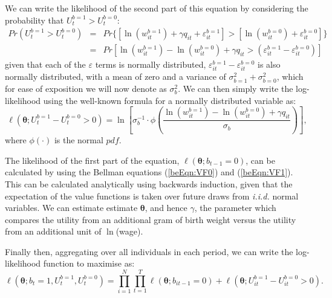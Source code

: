 \documentclass[a4paper, 12 pt]{article}
\theoremstyle{plain}
\begin{document}
\begin{doublespace}
We can write the likelihood of the second part of this equation by considering
the probability that $U_t^{b=1}>U_t^{b=0}$:
\begin{eqnarray}
\label{bqEqn:LL2}
Pr(U_t^{b=1}>U_t^{b=0})&=&Pr\{[\ln(w_{it}^{b=1}) + \gamma q_{it} + \varepsilon^{b=1}_{it}]
>[\ln(w_{it}^{b=0}) + \varepsilon^{b=0}_{it}]\} \nonumber \\
&=&Pr[\ln(w_{it}^{b=1})-\ln(w_{it}^{b=0})+ \gamma q_{it} >
(\varepsilon^{b=1}_{it}-\varepsilon^{b=0}_{it})]
\end{eqnarray}
given that each of the $\varepsilon$ terms is normally distributed,
$\varepsilon^{b=1}_{it}-\varepsilon^{b=0}_{it}$ is also normally distributed,
with a mean of zero and a variance of $\sigma_{b=1}^2+\sigma_{b=0}^2$, which for
ease of exposition we will now denote as $\sigma^2_b$.  We can then simply
write the log-likelihood using the well-known formula for a normally distributed
variable as:
\begin{equation}
\ell(\bm\theta;U_t^{b=1}-U_t^{b=0}>0) = \ln\left[\sigma_b^{-1}\cdot\phi
\left(\frac{\ln(w_{it}^{b=1})-\ln(w_{it}^{b=0})+ \gamma q_{it}}{\sigma_b}\right)\right],
\end{equation}
where $\phi(\cdot)$ is the normal $pdf$.

The likelihood of the first part of the equation, $\ell(\bm\theta;b_{t-1}=0)$, can
be calculated by using the Bellman equations (\ref{beEqn:VF0}) and (\ref{beEqn:VF1}).
This can be calculated analytically using backwards induction, given that the
expectation of the value functions is taken over future draws from \emph{i.i.d.} normal
variables.  We can estimate estimate $\bm{\theta}$, and
hence $\gamma$, the parameter which compares the utility from an additional gram of
birth weight versus the utility from an additional unit of $\ln$(wage).

Finally then, aggregating over all individuals in each period, we can write the
log-likelihood function to maximise as:
\[
\ell(\bm\theta;b_t=1,U_t^{b=1},U_t^{b=0})= \prod_{i=1}^N\prod_{t=1}^T
\ell(\bm\theta;b_{it-1}=0) + \ell(\bm\theta;U_{it}^{b=1}-U_{it}^{b=0}>0).
\]








\end{doublespace}
\end{document}
